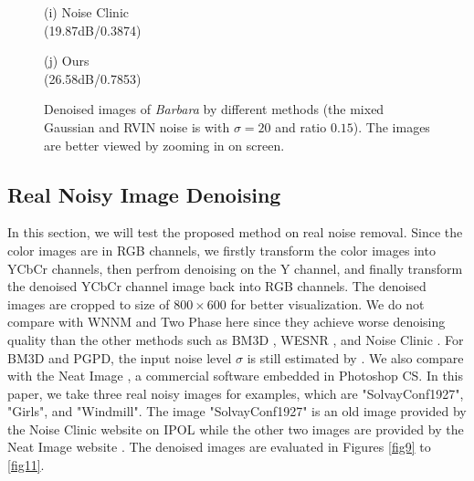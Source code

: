 \documentclass[runningheads]{llncs}
\begin{document}
\begin{figure*}
{\begin{minipage}[t]{0.2\textwidth}
\centering
{}
{\footnotesize (i) Noise Clinic \\(19.87dB/0.3874)}
\end{minipage}
\begin{minipage}[t]{0.2\textwidth}
\centering
{}
{\footnotesize (j) Ours \\(26.58dB/0.7853)}
\end{minipage}
}
\caption{Denoised images of \textsl{Barbara} by different methods (the mixed Gaussian and RVIN noise is with $\sigma = 20$ and ratio $0.15$). The images are better viewed by zooming in on screen.}
\label{fig8}
\end{figure*}\vspace{-0.1in}

\subsection{Real Noisy Image Denoising}
\vspace{-0.1in}
In this section, we will test the proposed method on real noise removal. Since the color images are in RGB channels, we firstly transform the color images into YCbCr channels, then perfrom denoising on the Y channel, and finally transform the denoised YCbCr channel image back into RGB channels. The denoised images are cropped to size of $800\times600$ for better visualization. We do not compare with WNNM \cite{wnnm} and Two Phase \cite{cai2010fast} here since they achieve worse denoising quality than the other methods such as BM3D \cite{bm3d}, WESNR \cite{wesnr}, and Noise Clinic \cite{noiseclinic}. For BM3D and PGPD, the input noise level $\sigma$ is still estimated by \cite{liu2013single}. We also compare with the Neat Image \cite{neatimage}, a commercial software embedded in Photoshop CS. In this paper, we take three real noisy images for examples, which are "SolvayConf1927", "Girls", and "Windmill". The image "SolvayConf1927" is an old image provided by the Noise Clinic website on IPOL \cite{ncwebsite} while the other two images are provided by the Neat Image website \cite{neatimage}. The denoised images are evaluated in Figures \ref{fig9} to \ref{fig11}.
\end{document}
